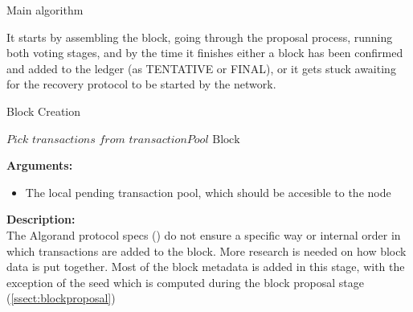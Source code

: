 \documentclass[10pt,a4paper]{article}
\begin{document}
\begin{section}{Main algorithm}
\begin{algorithm}[H]
\begin{algorithmic}[1]
    \EndFunction
    \end{algorithmic}
    \caption{\underline{Main node algorithm}}
\end{algorithm}

It starts by assembling the block, going through the proposal process,
running both voting stages, and by the time it finishes either a block has been
confirmed and added to the ledger (as TENTATIVE or FINAL), or it gets stuck awaiting for
the recovery protocol to be started by the network.

\begin{subsection}{Block Creation}\label{ssect:blockcreation}

\begin{algorithm}
    \begin{algorithmic}[1]
    
    \State $Pick$ $transactions$ $from$ $transactionPool$
    \State \Return $\mathrm{Block}$    
    \EndFunction
    \end{algorithmic}
    \caption{\underline{Block creation}}
\end{algorithm}

\noindent \textbf{Arguments:}
\begin{itemize}
    \item The local pending transaction pool, which should be accesible to the node\\
  \end{itemize}

\noindent \textbf{Description:}\\
The Algorand protocol specs (\cite{DBLP:conf/sosp/GiladHMVZ17}) do not ensure a specific way 
or internal order in which transactions are added to the block.
More research is needed on how block data is put together.
Most of the block metadata is added in this stage, with the exception of the seed
which is computed during the block proposal stage (\ref{ssect:blockproposal})\\


\end{subsection}
\end{section}
\end{document}
